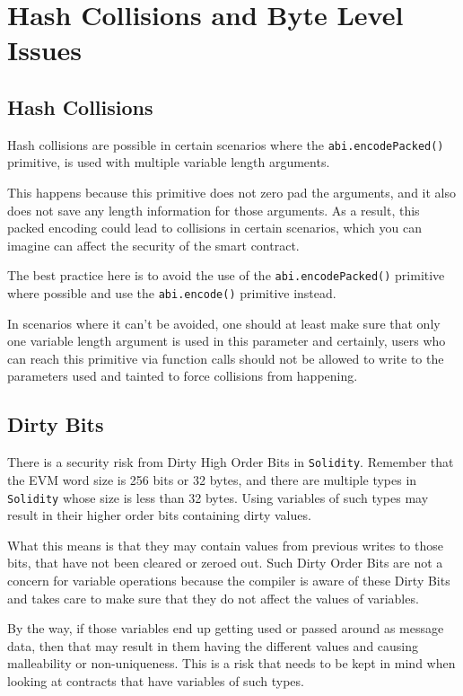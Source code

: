 \section{Hash Collisions and Byte Level
Issues}\label{hash-collisions-and-byte-level-issues}

\subsection{Hash Collisions}\label{hash-collisions}

Hash collisions are possible in certain scenarios where the
\texttt{abi.encodePacked()} primitive, is used with multiple variable
length arguments.

This happens because this primitive does not zero pad the arguments, and
it also does not save any length information for those arguments. As a
result, this packed encoding could lead to collisions in certain
scenarios, which you can imagine can affect the security of the smart
contract.

The best practice here is to avoid the use of the
\texttt{abi.encodePacked()} primitive where possible and use the
\texttt{abi.encode()} primitive instead.

In scenarios where it can't be avoided, one should at least make sure
that only one variable length argument is used in this parameter and
certainly, users who can reach this primitive via function calls should
not be allowed to write to the parameters used and tainted to force
collisions from happening.

\subsection{Dirty Bits}\label{dirty-bits}

There is a security risk from Dirty High Order Bits in
\texttt{Solidity}. Remember that the EVM word size is 256 bits or 32
bytes, and there are multiple types in \texttt{Solidity} whose size is
less than 32 bytes. Using variables of such types may result in their
higher order bits containing dirty values.

What this means is that they may contain values from previous writes to
those bits, that have not been cleared or zeroed out. Such Dirty Order
Bits are not a concern for variable operations because the compiler is
aware of these Dirty Bits and takes care to make sure that they do not
affect the values of variables.

By the way, if those variables end up getting used or passed around as
message data, then that may result in them having the different values
and causing malleability or non-uniqueness. This is a risk that needs to
be kept in mind when looking at contracts that have variables of such
types.

